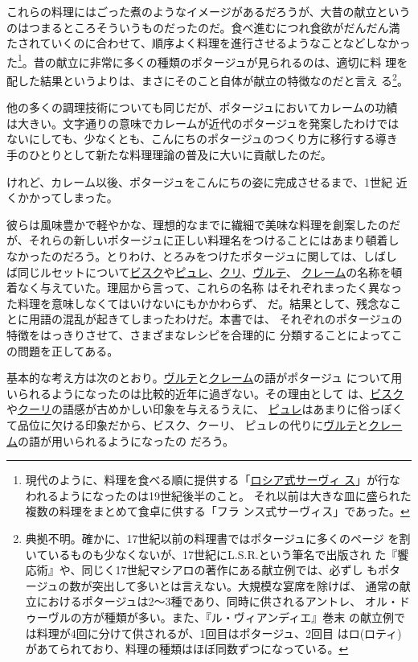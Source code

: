 これらの料理にはごった煮のようなイメージがあるだろうが、大昔の献立という
のはつまるところそういうものだったのだ。食べ進むにつれ食欲がだんだん満
たされていくのに合わせて、順序よく料理を進行させるようなことなどしなかっ
た\footnote{現代のように、料理を食べる順に提供する「\protect\hyperlink{service-russe}{ロシア式サーヴィ
  ス}」が行なわれるようになったのは19世紀後半のこと。
  それ以前は大きな皿に盛られた複数の料理をまとめて食卓に供する「フラ
  ンス式サーヴィス」であった。}。昔の献立に非常に多くの種類のポタージュが見られるのは、適切に料
理を配した結果というよりは、まさにそのこと自体が献立の特徴なのだと言え
る\footnote{典拠不明。確かに、17世紀以前の料理書ではポタージュに多くのページ
  を割いているものも少なくないが、17世紀にL.S.R.という筆名で出版され
  た『饗応術』や、同じく17世紀マシアロの著作にある献立例では、必ずし
  もポタージュの数が突出して多いとは言えない。大規模な宴席を除けば、
  通常の献立におけるポタージュは2〜3種であり、同時に供されるアントレ、
  オル・ドゥーヴルの方が種類が多い。また、『ル・ヴィアンディエ』巻末
  の献立例では料理が4回に分けて供されるが、1回目はポタージュ、2回目
  はロ(ロティ)があてられており、料理の種類はほぼ同数ずつになっている。}。

他の多くの調理技術についても同じだが、ポタージュにおいてカレームの功績
は大きい。文字通りの意味でカレームが近代のポタージュを発案したわけでは
ないにしても、少なくとも、こんにちのポタージュのつくり方に移行する導き
手のひとりとして新たな料理理論の普及に大いに貢献したのだ。

けれど、カレーム以後、ポタージュをこんにちの姿に完成させるまで、1世紀
近くかかってしまった。

彼らは風味豊かで軽やかな、理想的なまでに繊細で美味な料理を創案したのだ
が、それらの新しいポタージュに正しい料理名をつけることにはあまり頓着し
なかったのだろう。とりわけ、とろみをつけたポタージュに関しては、しばし
ば同じルセットについて\ul{ビスク}や\ul{ピュレ}、\ul{クリ}、\ul{ヴルテ}、
\ul{クレーム}の名称を頓着なく与えていた。理屈から言って、これらの名称
はそれぞれまったく異なった料理を意味しなくてはいけないにもかかわらず、
だ。結果として、残念なことに用語の混乱が起きてしまったわけだ。本書では、
それぞれのポタージュの特徴をはっきりさせて、さまざまなレシピを合理的に
分類することによってこの問題を正してある。

基本的な考え方は次のとおり。\ul{ヴルテ}と\ul{クレーム}の語がポタージュ
について用いられるようになったのは比較的近年に過ぎない。その理由として
は、\ul{ビスク}や\ul{クーリ}の語感が古めかしい印象を与えるうえに、
\ul{ピュレ}はあまりに俗っぽくて品位に欠ける印象だから、ビスク、クーリ、
ピュレの代りに\ul{ヴルテ}と\ul{クレーム}の語が用いられるようになったの
だろう。

